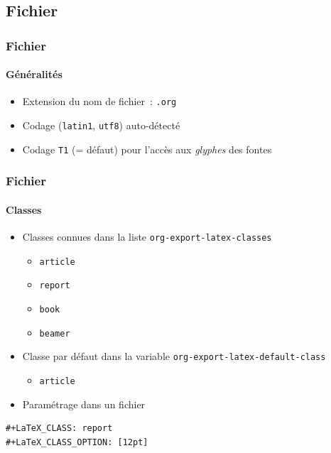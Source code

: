 \documentclass[presentation,t,hideothersubsections]{beamer}
\begin{document}
\subsection{Fichier}
\label{sec-2-1}
\begin{frame}
\frametitle{Fichier}
\framesubtitle{Généralités}
\label{sec-2-1-1}


\begin{itemize}
\item Extension du nom de fichier : \texttt{.org}
\item Codage (\texttt{latin1}, \texttt{utf8}) auto-détecté
\item Codage \texttt{T1} (= défaut) pour l'accès aux \emph{glyphes} des fontes
\end{itemize}
\end{frame}
\begin{frame}[fragile]
\frametitle{Fichier}
\framesubtitle{Classes}
\label{sec-2-1-2}


\begin{itemize}
\item Classes connues dans la liste \texttt{org-export-latex-classes}
\begin{itemize}
\item \texttt{article}
\item \texttt{report}
\item \texttt{book}
\item \texttt{beamer}
\end{itemize}
\item Classe par défaut dans la variable \texttt{org-export-latex-default-class}
\begin{itemize}
\item \texttt{article}
\end{itemize}
\item Paramétrage dans un fichier
\end{itemize}


\lstset{language=org}
\begin{lstlisting}
#+LaTeX_CLASS: report
#+LaTeX_CLASS_OPTION: [12pt]
\end{lstlisting}
\end{frame}
\end{document}
